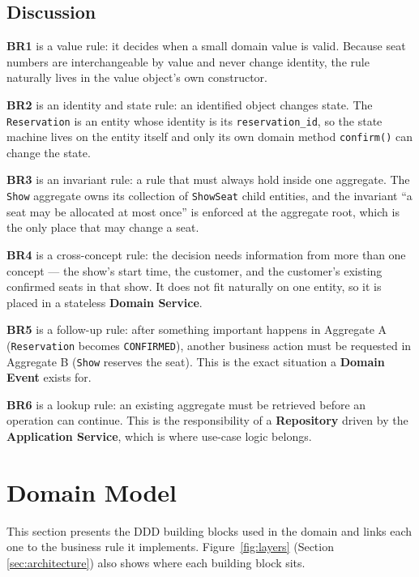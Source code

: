 \documentclass[11pt,a4paper]{article}
\newcommand{\code}[1]{\texttt{#1}}
\begin{document}
\subsection{Discussion}

\textbf{BR1} is a value rule: it decides when a small domain value is valid.
Because seat numbers are interchangeable by value and never change identity,
the rule naturally lives in the value object's own constructor.

\textbf{BR2} is an identity and state rule: an identified object changes state.
The \code{Reservation} is an entity whose identity is its
\code{reservation\_id}, so the state machine lives on the entity itself and only
its own domain method \code{confirm()} can change the state.

\textbf{BR3} is an invariant rule: a rule that must always hold inside one
aggregate. The \code{Show} aggregate owns its collection of \code{ShowSeat}
child entities, and the invariant ``a seat may be allocated at most once'' is
enforced at the aggregate root, which is the only place that may change a seat.

\textbf{BR4} is a cross-concept rule: the decision needs information from more
than one concept --- the show's start time, the customer, and the customer's
existing confirmed seats in that show. It does not fit naturally on one entity,
so it is placed in a stateless \textbf{Domain Service}.

\textbf{BR5} is a follow-up rule: after something important happens in
Aggregate A (\code{Reservation} becomes \code{CONFIRMED}), another business
action must be requested in Aggregate B (\code{Show} reserves the seat). This
is the exact situation a \textbf{Domain Event} exists for.

\textbf{BR6} is a lookup rule: an existing aggregate must be retrieved before an
operation can continue. This is the responsibility of a \textbf{Repository}
driven by the \textbf{Application Service}, which is where use-case logic
belongs.

\section{Domain Model}\label{sec:domain-model}

This section presents the DDD building blocks used in the domain and links each
one to the business rule it implements. Figure~\ref{fig:layers} (Section
\ref{sec:architecture}) also shows where each building block sits.
\end{document}
